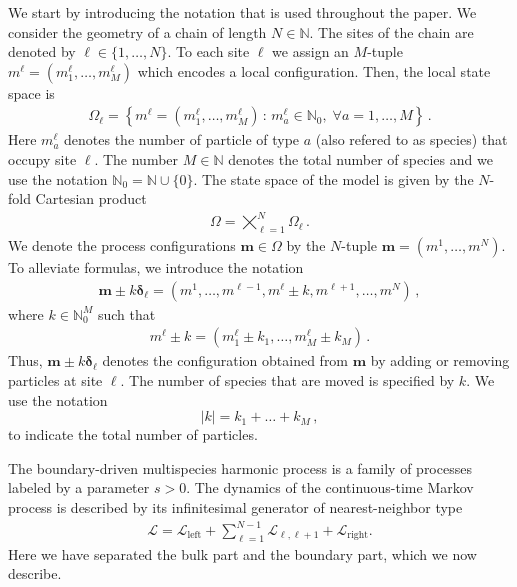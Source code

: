 \documentclass[11pt]{article}
\numberwithin{equation}{section}
\newcommand{\M}{M}
\newcommand{\N}{N}
\begin{document}
We start by introducing the notation that is used throughout the paper.
 We consider the geometry of a chain of length $\N\in \mathbb{N}$. The sites of the chain are denoted by $\ell\in \{1,\ldots, \N\}$. To each site $\ell$ we assign an $M$-tuple $m^{\ell }=(m_{1}^{\ell },\ldots,m_{M}^{\ell })$
which encodes a local configuration. Then, the local state space is
\begin{align}\label{single-site-space}
	 \Omega_{\ell}=\left\{m^{\ell }=(m_{1}^{\ell },\ldots,m_{M}^{\ell })\,:\, m_{a}^{\ell }\in \mathbb{N}_{0},\; \forall a=1,\ldots,\M\right\}\,.
    	\end{align}
Here $m_a^\ell$ denotes the number of particle of type $a$ (also refered to as species) that occupy site $\ell$. The number $\M\in \mathbb{N}$ denotes the total number of species   and we use the notation $\mathbb{N}_{0} = \mathbb{N} \cup\{0\}$.
The state space of the model is given by the $N$-fold Cartesian product
\begin{align}\label{cartpro}
	{\Omega}=\bigtimes_{\ell =1}^{\N}\Omega_\ell\,.
\end{align}
We denote the process configurations $\bm{m}\in\Omega$ by the $N$-tuple $\bm{m}=(m^{1},\ldots,m^{\N})$.
To alleviate formulas, we introduce the notation
\begin{align}
	\bm{m}\pm k \bm{\delta}_{\ell }= (m^{1},\ldots,m^{\ell -1},m^\ell \pm k,m^{\ell +1},\ldots,m^{\N})\,,
\end{align}
where  $k\in\mathbb{N}_0^\M$ such that
\begin{align}
	m^{\ell }\pm k=(m_{1}^{\ell }\pm k_{1},\ldots,m_{\M}^{\ell }\pm k_{\M})\,.
\end{align}
Thus, $\bm{m}\pm k \bm{\delta}_{\ell }$ denotes the configuration  obtained from $\bm{m}$ by adding or removing particles at site $\ell$.
The number of species that are moved is specified by $k$.
We use the notation
\begin{equation}
 |k|=k_{1}+\ldots+k_{\M}\,,
\end{equation}
 to indicate the total number of  particles.

 The boundary-driven multispecies harmonic process is a family of processes labeled by a parameter $s>0$.
 The  dynamics of the continuous-time Markov  process is described by its infinitesimal generator of nearest-neighbor type
\begin{align}\label{boundary-driven-generator}
	\mathcal{L}=\mathcal{L}_{\text{left}}+\sum_{\ell =1}^{\N-1}\mathcal{L}_{\ell ,\ell +1}+\mathcal{L}_{\text{right}}.
\end{align}
Here we have separated the bulk part and the boundary part, which we now describe.
\end{document}
